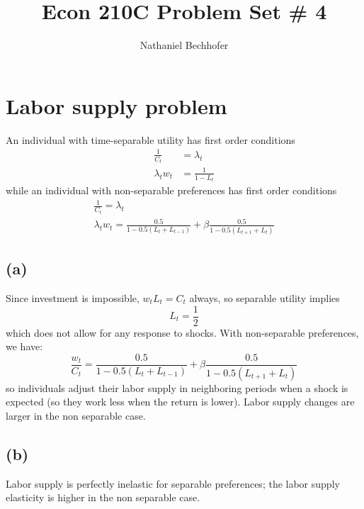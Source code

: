 \documentclass[12pt]{article}
\title{Econ 210C Problem Set \# 4}
\author{Nathaniel Bechhofer}
\begin{document}
    
    
    
    
    \maketitle
    
    \section{Labor supply problem}
    An individual with time-separable utility has first order conditions
    \begin{align*}
    \frac{1}{C_t} &= \lambda_t  \\
    \lambda_t w_t &= \frac{1}{1-L_t} 
    \end{align*}
    while an individual with non-separable preferences has first order conditions
    \begin{gather*}
    \frac{1}{C_t} = \lambda_t  \\
    \lambda_t w_t = \frac{0.5}{1 - 0.5 \left( L_t + L_{t-1} \right)} + \beta \frac{0.5}{1 - 0.5 \left( L_{t+1} + L_t \right)}
    \end{gather*}
    \subsection*{(a)}
        Since investment is impossible, $w_t L_t = C_t$ always, so separable utility implies 
        \begin{equation*}
        L_t = \frac{1}{2}
        \end{equation*}
        which does not allow for any response to shocks. 
        With non-separable preferences, we have:
        \begin{equation*}
        \frac{w_t}{C_t}  = \frac{0.5}{1 - 0.5 \left( L_t + L_{t-1} \right)} + \beta \frac{0.5}{1 - 0.5 \left( L_{t+1} + L_t \right)}
        \end{equation*}
        so individuals adjust their labor supply in neighboring periods when a shock is expected (so they work less when the return is lower).
        Labor supply changes are larger in the non separable case. 
        
    \subsection*{(b)} 
    Labor supply is perfectly inelastic for separable preferences; the labor supply elasticity is higher in the non separable case. 
    
\end{document}
